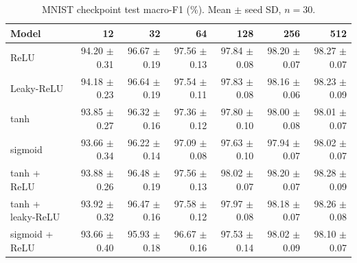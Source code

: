 \begin{table}[htbp]
\centering
\caption{MNIST checkpoint test macro-F1 (\%). Mean $\pm$ seed SD, $n=30$.}
\label{tab:mnist:test_f1_best}
\footnotesize
\begin{tabular}{@{}lrrrrrr@{}}
\toprule
Model & 12 & 32 & 64 & 128 & 256 & 512 \\
\midrule
ReLU & 94.20 $\pm$ 0.31 & 96.67 $\pm$ 0.19 & 97.56 $\pm$ 0.13 & 97.84 $\pm$ 0.08 & 98.20 $\pm$ 0.07 & 98.27 $\pm$ 0.07 \\
Leaky-ReLU & 94.18 $\pm$ 0.23 & 96.64 $\pm$ 0.19 & 97.54 $\pm$ 0.11 & 97.83 $\pm$ 0.08 & 98.16 $\pm$ 0.06 & 98.23 $\pm$ 0.09 \\
tanh & 93.85 $\pm$ 0.27 & 96.32 $\pm$ 0.16 & 97.36 $\pm$ 0.12 & 97.80 $\pm$ 0.10 & 98.00 $\pm$ 0.08 & 98.01 $\pm$ 0.07 \\
sigmoid & 93.66 $\pm$ 0.34 & 96.22 $\pm$ 0.14 & 97.09 $\pm$ 0.08 & 97.63 $\pm$ 0.10 & 97.94 $\pm$ 0.07 & 98.02 $\pm$ 0.07 \\
tanh + ReLU & 93.88 $\pm$ 0.26 & 96.48 $\pm$ 0.19 & 97.56 $\pm$ 0.13 & 98.02 $\pm$ 0.07 & 98.20 $\pm$ 0.07 & 98.28 $\pm$ 0.09 \\
tanh + leaky-ReLU & 93.92 $\pm$ 0.32 & 96.47 $\pm$ 0.16 & 97.58 $\pm$ 0.12 & 97.97 $\pm$ 0.08 & 98.18 $\pm$ 0.07 & 98.26 $\pm$ 0.08 \\
sigmoid + ReLU & 93.66 $\pm$ 0.40 & 95.93 $\pm$ 0.18 & 96.67 $\pm$ 0.16 & 97.53 $\pm$ 0.14 & 98.02 $\pm$ 0.09 & 98.10 $\pm$ 0.07 \\
\bottomrule
\end{tabular}
\par{}
\end{table}
